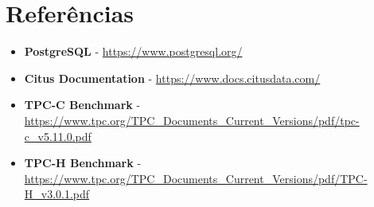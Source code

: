 \section{Referências}
\begin{itemize}
	\item \textbf{PostgreSQL} - \url{https://www.postgresql.org/}
	\item \textbf{Citus Documentation} - \url{https://www.docs.citusdata.com/}
	\item \textbf{TPC-C Benchmark} - \url{https://www.tpc.org/TPC_Documents_Current_Versions/pdf/tpc-c_v5.11.0.pdf}
	\item \textbf{TPC-H Benchmark} - \url{https://www.tpc.org/TPC_Documents_Current_Versions/pdf/TPC-H_v3.0.1.pdf}
\end{itemize}